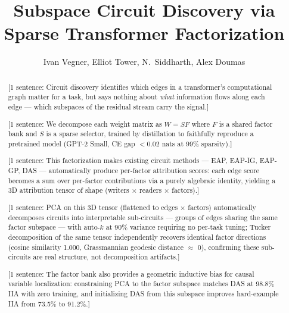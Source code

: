 \documentclass[11pt]{article}
\title{Subspace Circuit Discovery via Sparse Transformer Factorization}
\author{Ivan Vegner, Elliot Tower, N.\ Siddharth, Alex Doumas}
\begin{document}
\maketitle


\begin{abstract}


[1 sentence: Circuit discovery identifies which edges in a transformer's
computational graph matter for a task, but says nothing about \emph{what}
information flows along each edge --- which subspaces of the residual
stream carry the signal.]

[1 sentence: We decompose each weight matrix as $W = SF$ where $F$ is a
shared factor bank and $S$ is a sparse selector, trained by distillation
to faithfully reproduce a pretrained model (GPT-2 Small, CE gap $<$0.02
nats at 99\% sparsity).]

[1 sentence: This factorization makes existing circuit methods ---
EAP, EAP-IG, EAP-GP, DAS --- automatically produce per-factor
attribution scores: each edge score becomes a sum over per-factor
contributions via a purely algebraic identity, yielding a 3D attribution
tensor of shape (writers $\times$ readers $\times$ factors).]

[1 sentence: PCA on this 3D tensor (flattened to edges $\times$ factors)
automatically decomposes circuits into interpretable sub-circuits --- groups
of edges sharing the same factor subspace --- with auto-$k$ at 90\% variance
requiring no per-task tuning; Tucker decomposition of the same tensor
independently recovers identical factor directions (cosine similarity 1.000,
Grassmannian geodesic distance $\approx$ 0), confirming these sub-circuits
are real structure, not decomposition artifacts.]

[1 sentence: The factor bank also provides a geometric inductive bias
for causal variable localization: constraining PCA to the factor
subspace matches DAS at 98.8\% IIA with zero training, and initializing
DAS from this subspace improves hard-example IIA from 73.5\% to 91.2\%.]


\end{abstract}
\end{document}
